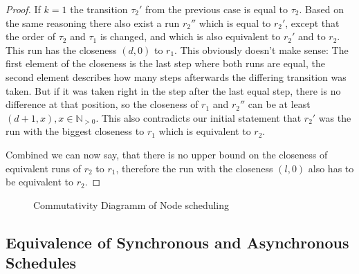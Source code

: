 \begin{proof}
If \(k = 1\) the transition \(\tau_2'\) from the previous case is equal to \(\tau_2\).
Based on the same reasoning there also exist a run \(r_2''\) which is equal to \(r_2'\), except that the order of \(\tau_2\) and \(\tau_1\) is changed, and which is also equivalent to \(r_2'\) and to \(r_2\).
This run has the closeness \((d, 0)\) to \(r_1\).
This obviously doesn't make sense: The first element of the closeness is the last step where both runs are equal, the second element describes how many steps afterwards the differing transition was taken.
But if it was taken right in the step after the last equal step, there is no difference at that position, so the closeness of \(r_1\) and \(r_2''\) can be at least \((d+1, x), x \in \mathbb{N}_{>0}\).
This also contradicts our initial statement that \(r_2'\) was the run with the biggest closeness to \(r_1\) which is equivalent to \(r_2\).

Combined we can now say, that there is no upper bound on the closeness of equivalent runs of \(r_2\) to \(r_1\), therefore the run with the closeness \((l, 0)\) also has to be equivalent to \(r_2\).

\end{proof}


\begin{figure}
  \caption{Commutativity Diagramm of Node scheduling}
\label{fig:chap3:sec_sync:commutativity_scheduling}
\end{figure}



\subsection{Equivalence of Synchronous and Asynchronous Schedules}
\label{sec:concepts:equivalence_without_timing:sync_async}

